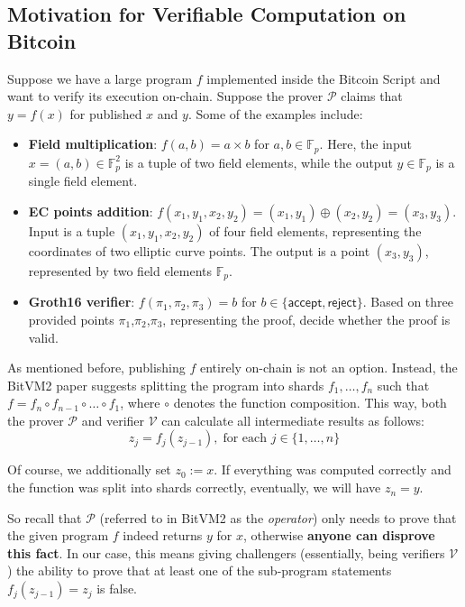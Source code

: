 \documentclass{iacrtrans}
\begin{document}
\subsection{Motivation for Verifiable Computation on Bitcoin}
Suppose we have a large program $f$ implemented inside the Bitcoin Script and want to verify its execution on-chain. Suppose the prover $\mathcal{P}$ claims that ${y} = f({x})$ for published ${x}$ and ${y}$. Some of the examples include:
\begin{itemize}
    \item \textbf{Field multiplication}: $f(a,b) = a \times b$ for $a,b \in \mathbb{F}_p$. Here, the input ${x}=(a,b) \in \mathbb{F}_p^2$ is a tuple of two field elements, while the output $y \in \mathbb{F}_p$ is a single field element.
    \item \textbf{EC points addition}: $f(x_1,y_1,x_2,y_2) = (x_1,y_1) \oplus (x_2,y_2) = (x_3,y_3)$. Input is a tuple $(x_1,y_1,x_2,y_2)$ of four field elements, representing the coordinates of two elliptic curve points. The output is a point $(x_3,y_3)$, represented by two field elements $\mathbb{F}_p$.
    \item \textbf{Groth16 verifier}: $f(\pi_1,\pi_2,\pi_3) = b$ for $b \in \{\mathsf{accept}, \mathsf{reject}\}$. Based on three provided points $\pi_1$,$\pi_2$,$\pi_3$, representing the proof, decide whether the proof is valid.
\end{itemize}

As mentioned before, publishing $f$ entirely on-chain is not an option. Instead, the BitVM2 paper suggests splitting the program into shards $f_1,\dots,f_n$ such that $f=f_n \circ f_{n-1} \circ \dots \circ f_1$, where $\circ$ denotes the function composition. This way, both the prover $\mathcal{P}$ and verifier $\mathcal{V}$ can calculate all intermediate results as follows:
\begin{equation*}
    {z}_j = f_j({z}_{j-1}), \; \text{for each $j \in \{1,\dots,n\}$}
\end{equation*}

Of course, we additionally set ${z}_0 := {x}$. If everything was computed correctly and the function was split into shards correctly, eventually, we will have ${z}_n = {y}$.  

So recall that $\mathcal{P}$ (referred to in BitVM2 as the \textit{operator}) only needs to prove that the given program $f$ indeed returns ${y}$ for \({x}\), otherwise \textbf{anyone can disprove this fact}. In our case, this means giving challengers (essentially, being verifiers $\mathcal{V}$) the ability to prove that at least one of the sub-program statements \(f_j({z}_{j-1}) = {z}_j\) is false.
\end{document}
